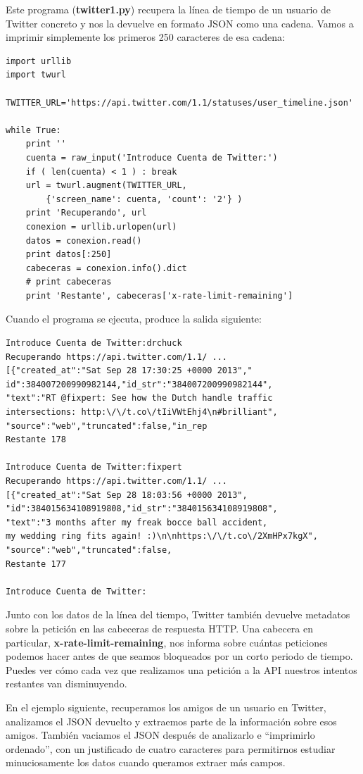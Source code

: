 Este programa ({\bf twitter1.py}) recupera la línea de tiempo
de un usuario de Twitter concreto y nos la devuelve en formato
JSON como una cadena. Vamos a imprimir simplemente los primeros 250
caracteres de esa cadena:

\beforeverb
\begin{verbatim}
import urllib
import twurl

TWITTER_URL='https://api.twitter.com/1.1/statuses/user_timeline.json'

while True:
    print ''
    cuenta = raw_input('Introduce Cuenta de Twitter:')
    if ( len(cuenta) < 1 ) : break
    url = twurl.augment(TWITTER_URL,
        {'screen_name': cuenta, 'count': '2'} )
    print 'Recuperando', url
    conexion = urllib.urlopen(url)
    datos = conexion.read()
    print datos[:250]
    cabeceras = conexion.info().dict
    # print cabeceras
    print 'Restante', cabeceras['x-rate-limit-remaining']
\end{verbatim}
\afterverb
%
Cuando el programa se ejecuta, produce la salida siguiente: 
 
\beforeverb
\begin{verbatim}
Introduce Cuenta de Twitter:drchuck
Recuperando https://api.twitter.com/1.1/ ...
[{"created_at":"Sat Sep 28 17:30:25 +0000 2013","
id":384007200990982144,"id_str":"384007200990982144",
"text":"RT @fixpert: See how the Dutch handle traffic 
intersections: http:\/\/t.co\/tIiVWtEhj4\n#brilliant",
"source":"web","truncated":false,"in_rep
Restante 178

Introduce Cuenta de Twitter:fixpert
Recuperando https://api.twitter.com/1.1/ ...
[{"created_at":"Sat Sep 28 18:03:56 +0000 2013",
"id":384015634108919808,"id_str":"384015634108919808",
"text":"3 months after my freak bocce ball accident, 
my wedding ring fits again! :)\n\nhttps:\/\/t.co\/2XmHPx7kgX",
"source":"web","truncated":false,
Restante 177

Introduce Cuenta de Twitter:
\end{verbatim}
\afterverb
%
Junto con los datos de la línea del tiempo, Twitter también devuelve
metadatos sobre la petición en las cabeceras de respuesta HTTP.
Una cabecera en particular, {\bf x-rate-limit-remaining}, nos informa
sobre cuántas peticiones podemos hacer antes de que seamos bloqueados
por un corto periodo de tiempo. Puedes ver cómo cada vez que realizamos
una petición a la API nuestros intentos restantes van disminuyendo.

En el ejemplo siguiente, recuperamos los amigos de un usuario en Twitter,
analizamos el JSON devuelto y extraemos parte de la información
sobre esos amigos. También vaciamos el JSON después de analizarlo e
``imprimirlo ordenado'', con un justificado de cuatro caracteres para permitirnos
estudiar minuciosamente los datos cuando queramos extraer más campos.

